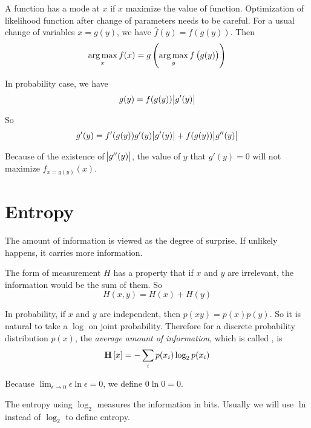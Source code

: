 \begin{theorem}
    A function has a mode at $x$ if $x$ maximize the value of function. Optimization of likelihood function after change of parameters needs to be careful. For a usual change of variables $x = g(y)$, we have $\hat{f}(y) = f(g(y))$. Then
    \begin{equation}
         \mathop{\arg\max}\limits_{x}f(x) = g\left(\mathop{\arg\max}\limits_{y}f\left(g(y)\right)\right)
    \end{equation}
    
    In probability case, we have
    \begin{equation}
        g(y) = f(g(y)) \abs{g'(y)}
    \end{equation}
    
    So
    \begin{equation}
        g'(y) = f'(g(y)) g'(y) \abs{g'(y)} + f(g(y)) \abs{g''(y)}
    \end{equation}
    
    Because of the existence of $\abs{g''(y)}$, the value of $y$ that $g'(y) = 0$ will not maximize $f_{x = g(y)}(x)$.
\end{theorem}


\section{Entropy}

\begin{definition}
    The amount of information is viewed as the degree of surprise. If unlikely happens, it carries more information. 
    
    The form of measurement $H$ has a property that if $x$ and $y$ are irrelevant, the information would be the sum of them. So
    \begin{equation}
        H(x,y) = H(x) + H(y)
    \end{equation}
    
    In probability, if $x$ and $y$ are independent, then $p(xy)= p(x) p(y)$. So it is natural to take a $\log$ on joint probability. Therefore for a discrete probability distribution $p(x)$, the \emph{average amount of information}, which is called , is
    \begin{equation}
        \mathop{\bf H\/}\left[\displaystyle x \right] = - \sum_i p(x_i) \log_2 p(x_i)
    \end{equation}
    
    Because $\displaystyle \lim_{\epsilon \rightarrow 0} \epsilon \ln \epsilon = 0$, we define $0 \ln 0 = 0$.
    
    The entropy using $\log_2$ measures the information in bits. Usually we will use $\ln$ instead of $\log_2$ to define entropy.
\end{definition}

